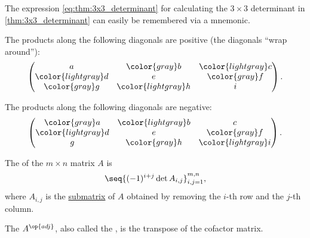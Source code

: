 \begin{remark}\label{rem:3x3_determinant}
  The expression \eqref{eq:thm:3x3_determinant} for calculating the \( 3 \times 3 \) determinant in \cref{thm:3x3_determinant} can easily be remembered via a mnemonic.

  The products along the following diagonals are positive (the diagonals \enquote{wrap around}):
  \begin{equation*}
    \begin{pmatrix}
      a                   & \color{gray} b      & \color{lightgray} c \\
      \color{lightgray} d & e                   & \color{gray} f      \\
      \color{gray} g      & \color{lightgray} h & i
    \end{pmatrix}.
  \end{equation*}

  The products along the following diagonals are negative:
  \begin{equation*}
    \begin{pmatrix}
      \color{gray} a      & \color{lightgray} b & c                   \\
      \color{lightgray} d & e                   & \color{gray} f      \\
      g                   & \color{gray} h      & \color{lightgray} i
    \end{pmatrix}.
  \end{equation*}
\end{remark}

\begin{definition}\label{def:adjugate_matrix}\mimprovised
  The  of the \( m \times n \) matrix \( A \) is
  \begin{equation*}
    \seq{ (-1)^{i + j} \det A_{i,j} }_{i,j=1}^{m,n},
  \end{equation*}
  where \( A_{i,j} \) is the \hyperref[def:submatrix]{submatrix} of \( A \) obtained by removing the \( i \)-th row and the \( j \)-th column.

  The  \( A^{\op{adj}} \), also called the , is the transpose of the cofactor matrix.
\end{definition}

